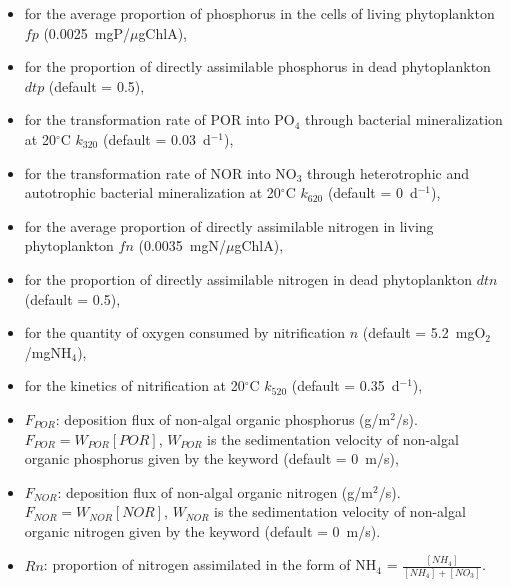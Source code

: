\begin{itemize}
\item {}
  for the average proportion of phosphorus in the cells of living phytoplankton $fp$ (0.0025~mgP/$\mu$gChlA),
\item {}
  for the proportion of directly assimilable phosphorus in dead phytoplankton $dtp$ (default = 0.5),
\item {}
  for the transformation rate of POR into PO$_4$ through bacterial mineralization at 20$^{\circ}$C
  $k_{320}$ (default = 0.03~d$^{-1}$),
\item {}
  for the transformation rate of NOR into NO$_3$ through heterotrophic
  and autotrophic bacterial mineralization at 20$^{\circ}$C $k_{620}$ (default = 0~d$^{-1}$),
\item {}
  for the average proportion of directly assimilable nitrogen in living phytoplankton $fn$ (0.0035~mgN/$\mu$gChlA),
\item {}
  for the proportion of directly assimilable nitrogen in dead phytoplankton $dtn$ (default = 0.5),
\item {}
  for the quantity of oxygen consumed by nitrification $n$ (default = 5.2~mgO$_2$/mgNH$_4$),
\item {}
  for the kinetics of nitrification at 20$^{\circ}$C $k_{520}$ (default = 0.35~d$^{-1}$),
\item $F_{POR}$: deposition flux of non-algal organic phosphorus (g/m$^2$/s).
  $F_{POR} = W_{POR} [POR]$,
  $W_{POR}$ is the sedimentation velocity of non-algal organic phosphorus
  given by the keyword 
  (default = 0~m/s),
\item $F_{NOR}$: deposition flux of non-algal organic nitrogen (g/m$^2$/s).
  $F_{NOR} = W_{NOR} [NOR]$, $W_{NOR}$ is the sedimentation velocity of non-algal organic nitrogen
  given by the keyword 
  (default = 0~m/s).

\item $Rn$: proportion of nitrogen assimilated in the form of NH$_4$ = $\frac{[NH_4]}{[NH_4]+[NO_3]}$.
\end{itemize}

